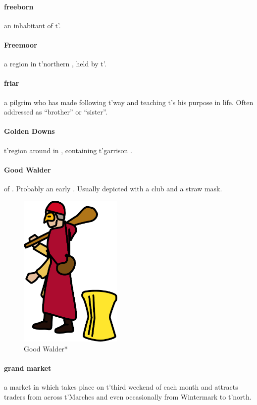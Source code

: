 \paragraph{freeborn} an inhabitant of t'\allowbreak {}.
\paragraph{Freemoor} a region in t'\allowbreak northern , held by t'\allowbreak {}.
\paragraph{friar} a pilgrim who has made following t'\allowbreak way and teaching t'\allowbreak {}s his purpose in life. Often addressed as “brother” or “sister”.
\paragraph{Golden Downs} t'\allowbreak region around  in , containing t'\allowbreak garrison .
\paragraph{Good Walder}  of . Probably an early . Usually depicted with a club and a straw mask.\begin{figure} \centering \includegraphics[width=5cm]{encyclopedia/Walder} \caption{Good Walder*}\end{figure}
\paragraph{grand market} a market in  which takes place on t'\allowbreak third weekend of each month and attracts traders from across t'\allowbreak Marches and even occasionally from Wintermark to t'\allowbreak north. 
